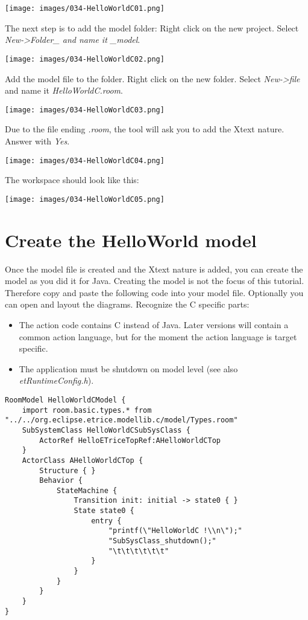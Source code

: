 \texttt{[image: images/034-HelloWorldC01.png]}

The next step is to add the model folder:
Right click on the new project. Select \textit{New->Folder_ and name it _model}.

\texttt{[image: images/034-HelloWorldC02.png]}

Add the model file to the folder. Right click on the new folder. Select \textit{New->file} and name it \textit{HelloWorldC.room}.

\texttt{[image: images/034-HelloWorldC03.png]}

Due to the file ending \textit{.room}, the tool will ask you to add the Xtext nature. Answer with \textit{Yes}. 

\texttt{[image: images/034-HelloWorldC04.png]}

The workspace should look like this:

\texttt{[image: images/034-HelloWorldC05.png]}



\section{Create the HelloWorld model}

Once the model file is created and the Xtext nature is added, you can create the model as you did it for Java.
Creating the model is not the focus of this tutorial. Therefore copy and paste the following code into your model file. Optionally you can open and layout the diagrams.  
Recognize the C specific parts:
\begin{itemize}
\item The action code contains C instead of Java. Later versions will contain a common action language, but for the moment the action language is target specific.
\item The application must be shutdown on model level (see also \textit{etRuntimeConfig.h}).  
\end{itemize}

\begin{verbatim} 
RoomModel HelloWorldCModel {
	import room.basic.types.* from "../../org.eclipse.etrice.modellib.c/model/Types.room"
	SubSystemClass HelloWorldCSubSysClass {
		ActorRef HelloETriceTopRef:AHelloWorldCTop 
	}
	ActorClass AHelloWorldCTop {
		Structure { }
		Behavior {
			StateMachine {
				Transition init: initial -> state0 { }
				State state0 {
					entry {
						"printf(\"HelloWorldC !\\n\");"
						"SubSysClass_shutdown();"
						"\t\t\t\t\t\t"
					}
				}
			}
		}
	}	
}
\end{verbatim}

